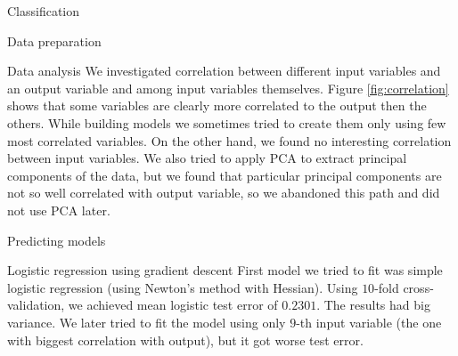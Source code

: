 \documentclass{article}
\begin{document}
\begin{section}{Classification}
\begin{subsection}{Data preparation}
\end{subsection}
\begin{subsection}{Data analysis}
We investigated correlation between different input variables and an output variable and among input variables themselves. Figure \ref{fig:correlation} shows that some variables are clearly more correlated to the output then the others. While building models we sometimes tried to create them only using few most correlated variables. On the other hand, we found no interesting correlation between input variables. We also tried to apply PCA to extract principal components of the data, but we found that particular principal components are not so well correlated with output variable, so we abandoned this path and did not use PCA later.
\begin{figure}[!t]
\center
{}
\hfill
{}
\caption{}
\end{figure}

\end{subsection}
\begin{subsection}{Predicting models}
\begin{subsubsection}{Logistic regression using gradient descent}
First model we tried to fit was simple logistic regression (using Newton's method with Hessian). Using $10$-fold cross-validation, we achieved mean logistic test error of $0.2301$. The results had big variance. We later tried to fit the model using only $9$-th input variable (the one with biggest correlation with output), but it got worse test error.


\end{subsubsection}
\end{subsection}
\end{section}
\end{document}

